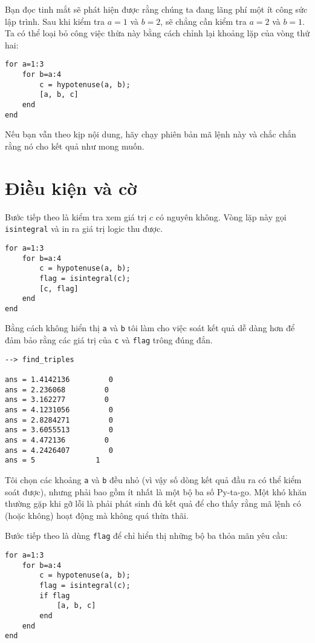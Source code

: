 \documentclass[12pt]{book}
\begin{document}
Bạn đọc tinh mắt sẽ phát hiện được rằng chúng ta đang lãng phí một
ít công sức lập trình. Sau khi kiểm tra $a=1$ và $b=2$, sẽ chẳng cần
kiểm tra $a=2$ và $b=1$. Ta có thể loại bỏ công việc thừa
này bằng cách chỉnh lại khoảng lặp của vòng thứ hai:

\begin{verbatim}
for a=1:3
    for b=a:4
        c = hypotenuse(a, b);
        [a, b, c]
    end
end
\end{verbatim}

Nếu bạn vẫn theo kịp nội dung, hãy chạy phiên bản mã lệnh này và
chắc chắn rằng nó cho kết quả như mong muốn.


\section{Điều kiện và cờ}

Bước tiếp theo là kiểm tra xem giá trị $c$ có nguyên không. Vòng lặp
này gọi {\tt isintegral} và in ra giá trị logic thu được.

\begin{verbatim}
for a=1:3
    for b=a:4
        c = hypotenuse(a, b);
        flag = isintegral(c);
        [c, flag]
    end
end
\end{verbatim}

Bằng cách không hiển thị {\tt a} và {\tt b} tôi làm cho việc soát
kết quả dễ dàng hơn để đảm bảo rằng các giá trị của {\tt c} và 
{\tt flag} trông đúng đắn.

\begin{verbatim}
--> find_triples

ans = 1.4142136         0
ans = 2.236068         0
ans = 3.162277         0
ans = 4.1231056         0
ans = 2.8284271         0
ans = 3.6055513         0
ans = 4.472136         0
ans = 4.2426407         0
ans = 5              1
\end{verbatim}

Tôi chọn các khoảng {\tt a} và {\tt b} đều nhỏ (vì vậy số dòng
kết quả đầu ra có thể kiểm soát được), nhưng phải bao gồm
ít nhất là một bộ ba số Py-ta-go. Một khó khăn thường gặp khi
gỡ lỗi là phải phát sinh đủ kết quả để cho thấy rằng mã lệnh
có (hoặc không) hoạt động mà không quá thừa thãi.

Bước tiếp theo là dùng {\tt flag} để chỉ hiển thị những bộ ba
thỏa mãn yêu cầu:

\begin{verbatim}
for a=1:3
    for b=a:4
        c = hypotenuse(a, b);
        flag = isintegral(c);
        if flag
            [a, b, c]
        end
    end
end
\end{verbatim}
\end{document}

